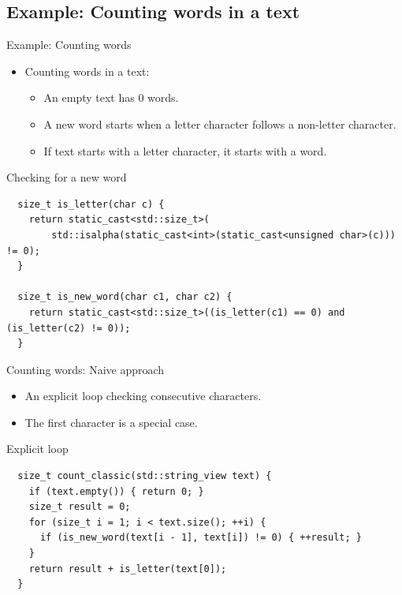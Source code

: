 \subsection{Example: Counting words in a text}

\begin{frame}[t,fragile]{Example: Counting words}
\begin{itemize}
\item Counting words in a text:
    \begin{itemize}
        \item An empty text has 0 words.
        \item A new word starts when a letter character follows a non-letter character.
        \item If text starts with a letter character, it starts with a word.
    \end{itemize}
\end{itemize}

\begin{block}{Checking for a new word}
\begin{lstlisting}
  size_t is_letter(char c) {
    return static_cast<std::size_t>(
        std::isalpha(static_cast<int>(static_cast<unsigned char>(c))) != 0);
  }

  size_t is_new_word(char c1, char c2) {
    return static_cast<std::size_t>((is_letter(c1) == 0) and (is_letter(c2) != 0));
  }
\end{lstlisting}
\end{block}

\end{frame}

\begin{frame}[t,fragile]{Counting words: Naive approach}
    \begin{itemize}
        \item An explicit loop checking consecutive characters.
        \item The first character is a special case.
    \end{itemize}
\begin{block}{Explicit loop}
\begin{lstlisting}
  size_t count_classic(std::string_view text) {
    if (text.empty()) { return 0; }
    size_t result = 0;
    for (size_t i = 1; i < text.size(); ++i) {
      if (is_new_word(text[i - 1], text[i]) != 0) { ++result; }
    }
    return result + is_letter(text[0]);
  }
\end{lstlisting}
\end{block}
\end{frame}

